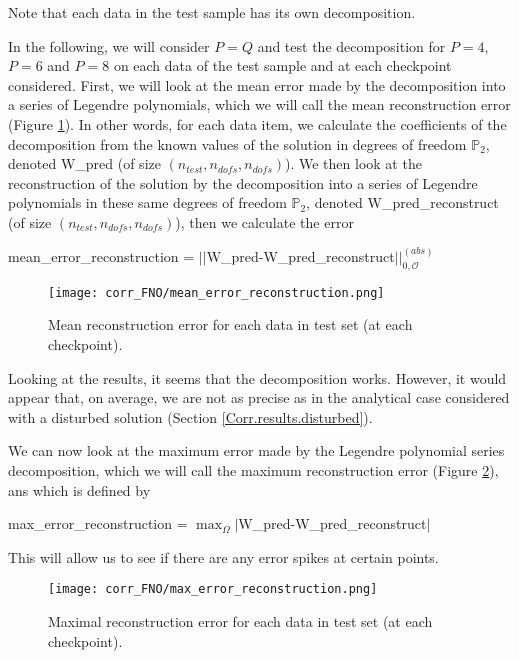 \begin{Rem}
	Note that each data in the test sample has its own decomposition.
\end{Rem}

In the following, we will consider $P=Q$ and test the decomposition for $P=4$, $P=6$ and $P=8$ on each data of the test sample and at each checkpoint considered. First, we will look at the mean error made by the decomposition into a series of Legendre polynomials, which we will call the mean reconstruction error (Figure \ref{mean_error_reconstruction}). In other words, for each data item, we calculate the coefficients of the decomposition from the known values of the solution in degrees of freedom $\mathbb{P}_2$, denoted W\_pred (of size $(n_{test},n_{dofs},n_{dofs})$). We then look at the reconstruction of the solution by the decomposition into a series of Legendre polynomials in these same degrees of freedom $\mathbb{P}_2$, denoted W\_pred\_reconstruct (of size $(n_{test},n_{dofs},n_{dofs})$), then we calculate the error
\begin{center}
	 mean\_error\_reconstruction = $||$W\_pred-W\_pred\_reconstruct$||_{0,\mathcal{O}}^{(abs)}$
\end{center}

\begin{figure}[H]
	\centering
	\texttt{[image: corr\_FNO/mean\_error\_reconstruction.png]}
	\caption{Mean reconstruction error for each data in test set (at each checkpoint).}
	\label{mean_error_reconstruction}
\end{figure} 

Looking at the results, it seems that the decomposition works. However, it would appear that, on average, we are not as precise as in the analytical case considered with a disturbed solution (Section \ref{Corr.results.disturbed}).

We can now look at the maximum error made by the Legendre polynomial series decomposition, which we will call the maximum reconstruction error (Figure \ref{max_error_reconstruction}),  ans which is defined by
\begin{center}
	max\_error\_reconstruction = $\max_\Omega|$W\_pred-W\_pred\_reconstruct$|$
\end{center}
This will allow us to see if there are any error spikes at certain points.

\begin{figure}[H]
	\centering
	\texttt{[image: corr\_FNO/max\_error\_reconstruction.png]}
	\caption{Maximal reconstruction error for each data in test set (at each checkpoint).}
	\label{max_error_reconstruction}
\end{figure} 

